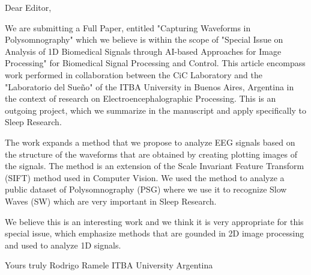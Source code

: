 Dear Editor, 

We are submitting a Full Paper, entitled "Capturing Waveforms in Polysomnography" which we believe is within the scope of "Special Issue on Analysis of 1D Biomedical Signals through AI-based Approaches for Image Processing" for Biomedical Signal Processing and Control.  This article encompass work performed in collaboration between the  CiC Laboratory and the "Laboratorio del Sueño" of the ITBA University in Buenos Aires, Argentina in the context of research on Electroencephalographic Processing.  This is an outgoing project, which we summarize in the manuscript and apply specifically to Sleep Research.

The work expands a method that we propose to analyze EEG signals based on the structure of the waveforms that are obtained by creating plotting images of the signals.  The method is an extension of the Scale Invariant Feature Transform (SIFT) method used in Computer Vision.  We used the method to analyze a public dataset of Polysomnography (PSG) where we use it to recognize Slow Waves (SW) which are very important in Sleep Research.

We believe this is an interesting work and we think it is very appropriate for this special issue, which emphasize methods that are gounded in 2D image processing and used to analyze 1D signals.

Yours truly
Rodrigo Ramele
ITBA University 
Argentina
